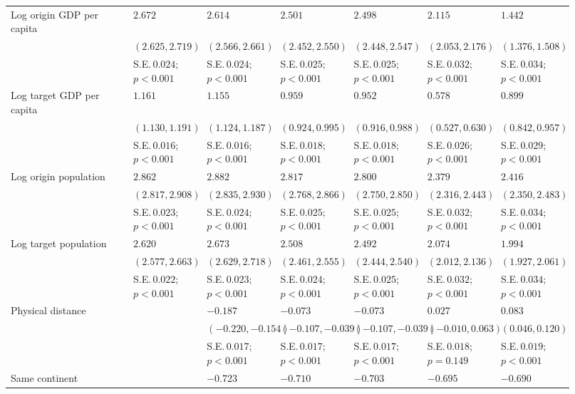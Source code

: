 {\begin{longtable}{p{0.2\linewidth}p{0.12\linewidth}p{0.12\linewidth}p{0.12\linewidth}p{0.12\linewidth}p{0.12\linewidth}p{0.12\linewidth}}
Log origin GDP per capita & $2.672$ & $2.614$ & $2.501$ & $2.498$ & $2.115$ & $1.442$\\ 
 & $(2.625, 2.719)$ & $(2.566, 2.661)$ & $(2.452, 2.550)$ & $(2.448, 2.547)$ & $(2.053, 2.176)$ & $(1.376, 1.508)$\\ 
 & S.E.\,$0.024$; ${p < 0.001}$ & S.E.\,$0.024$; ${p < 0.001}$ & S.E.\,$0.025$; ${p < 0.001}$ & S.E.\,$0.025$; ${p < 0.001}$ & S.E.\,$0.032$; ${p < 0.001}$ & S.E.\,$0.034$; ${p < 0.001}$\\ [0.8ex]  
Log target GDP per capita & $1.161$ & $1.155$ & $0.959$ & $0.952$ & $0.578$ & $0.899$\\ 
 & $(1.130, 1.191)$ & $(1.124, 1.187)$ & $(0.924, 0.995)$ & $(0.916, 0.988)$ & $(0.527, 0.630)$ & $(0.842, 0.957)$\\ 
 & S.E.\,$0.016$; ${p < 0.001}$ & S.E.\,$0.016$; ${p < 0.001}$ & S.E.\,$0.018$; ${p < 0.001}$ & S.E.\,$0.018$; ${p < 0.001}$ & S.E.\,$0.026$; ${p < 0.001}$ & S.E.\,$0.029$; ${p < 0.001}$\\ [0.8ex]  
Log origin population & $2.862$ & $2.882$ & $2.817$ & $2.800$ & $2.379$ & $2.416$\\ 
 & $(2.817, 2.908)$ & $(2.835, 2.930)$ & $(2.768, 2.866)$ & $(2.750, 2.850)$ & $(2.316, 2.443)$ & $(2.350, 2.483)$\\ 
 & S.E.\,$0.023$; ${p < 0.001}$ & S.E.\,$0.024$; ${p < 0.001}$ & S.E.\,$0.025$; ${p < 0.001}$ & S.E.\,$0.025$; ${p < 0.001}$ & S.E.\,$0.032$; ${p < 0.001}$ & S.E.\,$0.034$; ${p < 0.001}$\\ [0.8ex]  
Log target population & $2.620$ & $2.673$ & $2.508$ & $2.492$ & $2.074$ & $1.994$\\ 
 & $(2.577, 2.663)$ & $(2.629, 2.718)$ & $(2.461, 2.555)$ & $(2.444, 2.540)$ & $(2.012, 2.136)$ & $(1.927, 2.061)$\\ 
 & S.E.\,$0.022$; ${p < 0.001}$ & S.E.\,$0.023$; ${p < 0.001}$ & S.E.\,$0.024$; ${p < 0.001}$ & S.E.\,$0.025$; ${p < 0.001}$ & S.E.\,$0.032$; ${p < 0.001}$ & S.E.\,$0.034$; ${p < 0.001}$\\ [0.8ex]  
Physical distance &  & $-0.187$ & $-0.073$ & $-0.073$ & $0.027$ & $0.083$\\ 
 &  & $(-0.220, -0.154)$ & $(-0.107, -0.039)$ & $(-0.107, -0.039)$ & $(-0.010, 0.063)$ & $(0.046, 0.120)$\\ 
 &  & S.E.\,$0.017$; ${p < 0.001}$ & S.E.\,$0.017$; ${p < 0.001}$ & S.E.\,$0.017$; ${p < 0.001}$ & S.E.\,$0.018$; ${p = 0.149}$ & S.E.\,$0.019$; ${p < 0.001}$\\ [0.8ex]  
Same continent &  & $-0.723$ & $-0.710$ & $-0.703$ & $-0.695$ & $-0.690$\\ 

\end{longtable}}
